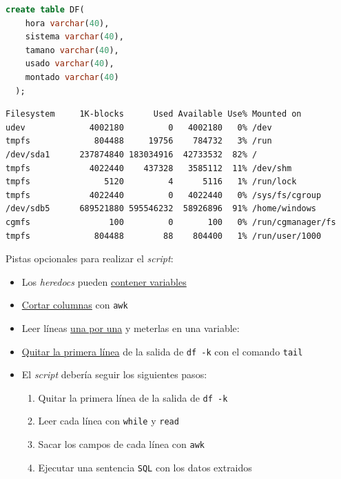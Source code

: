 \documentclass[a4paper]{article}
\begin{document}
\begin{lstlisting}[language=SQL,label=lst:tabla.sql,caption={Creación de la tabla \texttt{DF}},captionpos=b,numbers=none]
  create table DF(
    hora varchar(40),
    sistema varchar(40),
    tamano varchar(40),
    usado varchar(40),
    montado varchar(40)
  );
\end{lstlisting}

\begin{minipage}{\textwidth}
\begin{lstlisting}[language=bash,label=lst:df-k,caption={Ejemplo de salida del comando \texttt{df -k}},captionpos=b,numbers=none]
Filesystem     1K-blocks      Used Available Use% Mounted on
udev             4002180         0   4002180   0% /dev
tmpfs             804488     19756    784732   3% /run
/dev/sda1      237874840 183034916  42733532  82% /
tmpfs            4022440    437328   3585112  11% /dev/shm
tmpfs               5120         4      5116   1% /run/lock
tmpfs            4022440         0   4022440   0% /sys/fs/cgroup
/dev/sdb5      689521880 595546232  58926896  91% /home/windows
cgmfs                100         0       100   0% /run/cgmanager/fs
tmpfs             804488        88    804400   1% /run/user/1000
\end{lstlisting}
\end{minipage}

\begin{Aviso}
Pistas opcionales para realizar el \emph{script}:
\begin{itemize}
\item Los \emph{heredocs} pueden \href{http://superuser.com/questions/456615/how-to-pass-variables-to-a-heredoc-in-bash}{contener variables}
\item \href{https://www.cyberciti.biz/tips/processing-the-delimited-files-using-cut-and-awk.html}{Cortar columnas} con \texttt{awk}
\item Leer líneas \href{http://stackoverflow.com/questions/10929453/read-a-file-line-by-line-assigning-the-value-to-a-variable}{una por una} y meterlas en una variable:
\item \href{https://linuxconfig.org/commands-on-how-to-delete-a-first-line-from-a-text-file-using-bash-shell}{Quitar la primera línea} de la salida de \texttt{df -k} con el comando \texttt{tail}
\item El \emph{script} debería seguir los siguientes pasos:
\begin{enumerate}
\item Quitar la primera línea de la salida de \texttt{df -k}
\item Leer cada línea con \texttt{while} y \texttt{read}
\item Sacar los campos de cada línea con \texttt{awk}
\item Ejecutar una sentencia \texttt{SQL} con los datos extraidos
\end{enumerate}
\end{itemize}
\end{Aviso}
\end{document}
